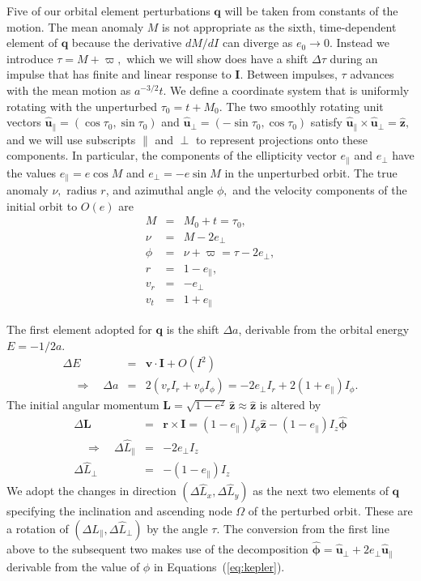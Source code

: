 \documentclass[linenumbers, onecolumn]{aastex631}
\newcommand{\vecI}{\mathbf{I}}
\newcommand{\phat}{\boldsymbol{\hat\phi}}
\newcommand{\uhat}{\boldsymbol{\hat u}}
\newcommand{\zhat}{\mathbf{\hat z}}
\newcommand{\vecq}{\mathbf{q}}
\newcommand{\vecr}{\mathbf{r}}
\newcommand{\vecv}{\mathbf{v}}
\newcommand{\lop}{\varpi}
\newcommand{\Lhat}{\hat L}
\begin{document}
Five of our orbital element perturbations $\vecq$ will be taken from constants of the motion.  The mean anomaly $M$ is not appropriate as the sixth, time-dependent element of $\vecq$ because the derivative $dM/dI$ can diverge as $e_0\rightarrow 0.$ Instead we introduce $\tau = M+\lop,$ which we will show does have a shift $\Delta\tau$ during an impulse that has finite and linear response to $\vecI$.  Between impulses, $\tau$ advances with the mean motion as $a^{-3/2}t.$  We define a coordinate system that is uniformly rotating with the unperturbed $\tau_0=t+M_0.$ The two smoothly rotating unit vectors $\uhat_\parallel=(\cos \tau_0, \sin \tau_0)$ and
$\uhat_\perp=(-\sin \tau_0, \cos \tau_0)$ satisfy $\uhat_\parallel \times \uhat_\perp = \zhat,$ and we will use subscripts $\parallel$ and $\perp$ to represent projections onto these components.  In particular, the components of the ellipticity vector $e_\parallel$ and $e_\perp$ have the values $e_\parallel=e\cos M$ and $e_\perp=-e\sin M$ in the unperturbed orbit.
The true anomaly $\nu,$ radius $r$, and azimuthal angle $\phi,$ and the velocity components of the initial orbit to $O(e)$ are
\begin{eqnarray}
  M & = & M_0 + t = \tau_0,  \nonumber \\
  \nu & = & M - 2 e_\perp \nonumber \\
  \phi & = & \nu + \lop = \tau - 2e_\perp, \nonumber\\
  r & = & 1-e_\parallel, \nonumber \\
  v_r & = & -e_\perp \nonumber \\
  v_t & = & 1 + e_\parallel
            \label{eq:kepler}
\end{eqnarray}

The first element adopted for $\vecq$ is the shift $\Delta a$, derivable from the orbital energy $E=-1/2a.$
\begin{eqnarray}
  \Delta E & = &  \vecv \cdot \vecI + O(I^2) \\
  \quad \Rightarrow \quad \Delta a & = & 2\left(v_r I_r + v_\phi I_\phi\right) = -2e_\perp I_r + 2(1+e_\parallel) I_\phi.
  \label{eq:da}
\end{eqnarray}
The initial angular momentum $\mathbf{L} = \sqrt{1-e^2}\,\zhat \approx \zhat$ is altered by
\begin{eqnarray}
  \Delta \mathbf{L} & = & \vecr \times \vecI = (1-e_\parallel) I_\phi \zhat - (1-e_\parallel) I_z \phat \\
  \quad \Rightarrow \quad \Delta \Lhat_\parallel & = & -2e_\perp I_z
  \label{eq:dLpar}\\
  \Delta \Lhat_\perp & = & -(1-e_\parallel)  I_z
                  \label{eq:dLperp}
\end{eqnarray}
We adopt the changes in direction $(\Delta\Lhat_x, \Delta\Lhat_y)$ as the next two elements of $\vecq$ specifying the inclination and ascending node $\Omega$ of the perturbed orbit.  These are a rotation of $(\Delta\Lhat_\parallel, \Delta\Lhat_\perp)$ by the angle $\tau.$  The conversion from the first line above to the subsequent two makes use of the decomposition $\phat=\uhat_\perp + 2e_\perp \uhat_\parallel$ derivable from the value of $\phi$ in Equations~(\ref{eq:kepler}).
\end{document}
